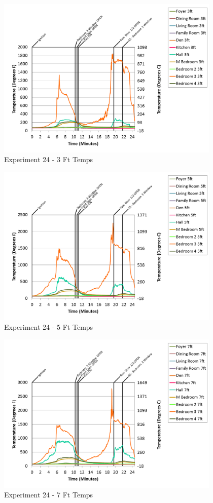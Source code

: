 \documentclass{article}
\begin{document}
\begin{appendices}
\begin{figure}[h!]
	\centering
	\includegraphics[height=3.05in]{0_Images/Results_Charts/Exp_24_Charts/3FtTemps.png}
	\caption{Experiment 24 - 3 Ft Temps}
\end{figure}

\clearpage

\begin{figure}[h!]
	\centering
	\includegraphics[height=3.05in]{0_Images/Results_Charts/Exp_24_Charts/5FtTemps.png}
	\caption{Experiment 24 - 5 Ft Temps}
\end{figure}


\begin{figure}[h!]
	\centering
	\includegraphics[height=3.05in]{0_Images/Results_Charts/Exp_24_Charts/7FtTemps.png}
	\caption{Experiment 24 - 7 Ft Temps}
\end{figure}


\end{appendices}
\end{document}
